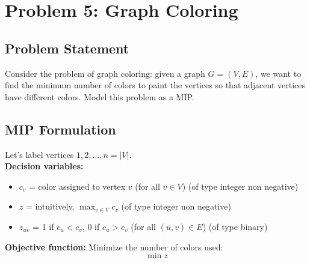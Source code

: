 \documentclass[a4paper,10pt]{article}
\begin{document}
\newpage
\section*{Problem 5: Graph Coloring}

\subsection*{Problem Statement}
Consider the problem of graph coloring: given a graph $G = (V,E)$, we want to find the minimum number of colors to paint the vertices so that adjacent vertices have different colors. Model this problem as a MIP.

\subsection*{MIP Formulation}

Let's label vertices $1, 2, \dots, n = |V|$.\\

\textbf{Decision variables:}
\begin{itemize}
  \item \(c_v\) = color assigned to vertex \(v\) (for all \(v \in V\)) (of type integer non negative)
  \item \(z\) = intuitively, \(\max_{v \in V} c_v\) (of type integer non negative)
  \item \(z_{uv}\) = 1 if \(c_u < c_v\), 0 if \(c_u > c_v\) (for all \((u,v) \in E\)) (of type binary)
\end{itemize}

\textbf{Objective function:}
Minimize the number of colors used:
\[\min z\]
\end{document}
